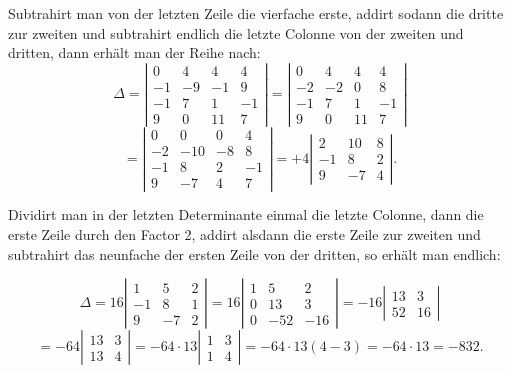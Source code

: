 \documentclass[11pt]{article}
\providecommand{\weberpage}[1]{}
\let\Delta\varDelta
\begin{document}
Subtrahirt man von der letzten Zeile die vierfache erste, addirt sodann die dritte zur zweiten und subtrahirt endlich die letzte Colonne von der zweiten und dritten, dann erhält man der Reihe nach:
\[
\Delta =
\left|
\begin{array}{rrrr}
0 & 4 & 4 & 4 \\
-1 & -9 & -1 & 9 \\
-1 & 7 & 1 & -1 \\
9 & 0 & 11 & 7
\end{array}
\right|
=
\left|
\begin{array}{rrrr}
0 & 4 & 4 & 4 \\
-2 & -2 & 0 & 8 \\
-1 & 7 & 1 & -1 \\
9 & 0 & 11 & 7
\end{array}
\right|
\]
\[
=
\left|
\begin{array}{rrrr}
0 & 0 & 0 & 4 \\
-2 & -10 & -8 & 8 \\
-1 & 8 & 2 & -1 \\
9 & -7 & 4 & 7
\end{array}
\right|
= +4
\left|
\begin{array}{rrr}
2 & 10 & 8 \\
-1 & 8 & 2 \\
9 & -7 & 4
\end{array}
\right|.
\]

Dividirt man in der letzten Determinante einmal die letzte Colonne, dann die erste Zeile durch den Factor 2, addirt alsdann die erste Zeile zur zweiten und subtrahirt das neunfache der ersten Zeile von der dritten, so erhält man endlich:


\weberpage{47}
\[
\Delta = 16
\left|
\begin{array}{rrr}
1 & 5 & 2 \\
-1 & 8 & 1 \\
9 & -7 & 2
\end{array}
\right|
= 16
\left|
\begin{array}{rrr}
1 & 5 & 2 \\
0 & 13 & 3 \\
0 & -52 & -16
\end{array}
\right|
= -16
\left|
\begin{array}{rr}
13 & 3 \\
52 & 16
\end{array}
\right|
\]
\[
= -64
\left|
\begin{array}{rr}
13 & 3 \\
13 & 4
\end{array}
\right|
= -64\cdot 13
\left|
\begin{array}{rr}
1 & 3 \\
1 & 4
\end{array}
\right|
= -64\cdot 13(4-3) = -64\cdot 13 = -832.
\]
\end{document}
